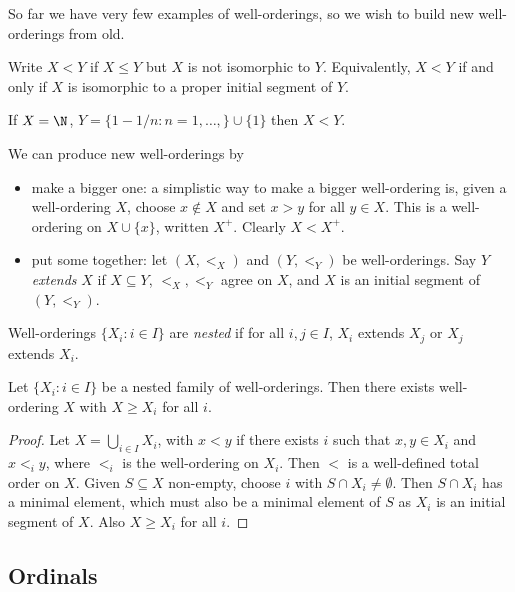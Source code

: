\documentclass[a4paper]{article}
\begin{document}
So far we have very few examples of well-orderings, so we wish to build new well-orderings from old.

\begin{notation}
  Write \(X < Y\) if \(X \leq Y\) but \(X\) is not isomorphic to \(Y\). Equivalently, \(X < Y\) if and only if \(X\) is isomorphic to a proper initial segment of \(Y\).
\end{notation}

\begin{eg}
  If \(X = \N\), \(Y = \{1 - 1/n: n = 1, \dots, \} \cup \{1\}\) then \(X < Y\).
\end{eg}

We can produce new well-orderings by
\begin{itemize}
\item make a bigger one: a simplistic way to make a bigger well-ordering is, given a well-ordering \(X\), choose \(x \notin X\) and set \(x > y\) for all \(y \in X\). This is a well-ordering on \(X \cup \{x\}\), written \(X^+\). Clearly \(X < X^+\).
\item put some together: let \((X, <_X)\) and \((Y, <_Y)\) be well-orderings. Say \(Y\) \emph{extends} \(X\) if \(X \subseteq Y\), \(<_X, <_Y\) agree on \(X\), and \(X\) is an initial segment of \((Y, <_Y)\).
\end{itemize}

Well-orderings \(\{X_i: i \in I\}\) are \emph{nested} if for all \(i, j \in I\), \(X_i\) extends \(X_j\) or \(X_j\) extends \(X_i\).

\begin{proposition}
  \label{prop:nested well-orderings}
  Let \(\{X_i: i \in I\}\) be a nested family of well-orderings. Then there exists well-ordering \(X\) with \(X \geq X_i\) for all \(i\).
\end{proposition}

\begin{proof}
  Let \(X = \bigcup_{i \in I} X_i\), with \(x < y\) if there exists \(i\) such that \(x, y \in X_i\) and \(x <_i y\), where \(<_i\) is the well-ordering on \(X_i\). Then \(<\) is a well-defined total order on \(X\). Given \(S \subseteq X\) non-empty, choose \(i\) with \(S \cap X_i \neq \emptyset\). Then \(S \cap X_i\) has a minimal element, which must also be a minimal element of \(S\) as \(X_i\) is an initial segment of \(X\). Also \(X \geq X_i\) for all \(i\).
\end{proof}

\subsection{Ordinals}
\end{document}

